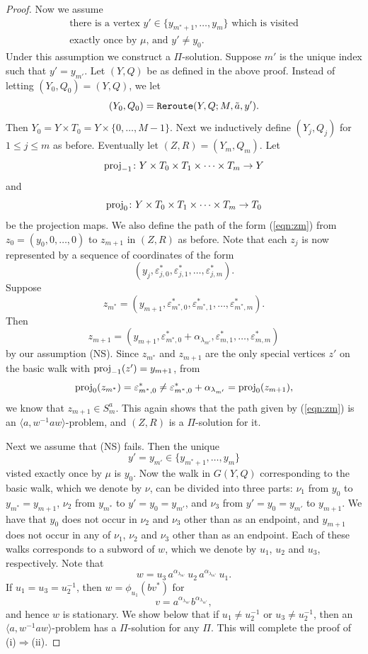 \documentclass[11pt]{amsart}
\theoremstyle{definition}
\theoremstyle{definition}
\numberwithin{equation}{section}
\begin{document}
\begin{proof}
Now we assume
\begin{equation}\label{NS} \tag{NS} \begin{array}{l} \mbox{there is a vertex $y'\in\{y_{m^*+1}, \dots, y_m\}$ which is visited} \\
\mbox{exactly once by $\mu$, and $y'\neq y_0$.}\end{array}
\end{equation}
Under this assumption we construct a $\Pi$-solution. Suppose $m'$ is the unique index such that $y'=y_{m'}$. Let $(Y, Q)$ be as defined in the above proof. Instead of letting $(Y_0, Q_0)=(Y, Q)$, we let
$$ (Y_0, Q_0)=\mbox{\tt Reroute}(Y, Q; M, \tilde{a}, y'). $$
Then $Y_0=Y\times T_0=Y\times \{0, \dots, M-1\}$. Next we inductively define $(Y_j, Q_j)$ for $1\leq j\leq m$ as before. Eventually let $(Z, R)=(Y_m, Q_m)$. Let
$$ \mbox{\rm proj}_{-1}\colon Y\times T_0\times T_1\times \cdots \times T_m\to Y $$
and $$\mbox{\rm proj}_0\colon Y\times T_0\times T_1\times \cdots \times T_m\to T_0 $$
be the projection maps. We also define the path of the form (\ref{eqn:zm}) from $z_0=(y_0, 0, \dots, 0)$ to $z_{m+1}$ in $(Z, R)$ as before. Note that each $z_j$ is now represented by a sequence of coordinates of the form
\begin{equation}\label{eqn:zjcoordinatesnew} (y_j, \varepsilon^*_{j,0}, \varepsilon^*_{j, 1},\dots, \varepsilon^*_{j, m}).
\end{equation}
Suppose 
$$  z_{m^*}=(y_{m+1}, \varepsilon^*_{m^*,0}, \varepsilon^*_{m^*, 1},\dots, \varepsilon^*_{m^*, m}). $$
Then
$$ z_{m+1}=(y_{m+1}, \varepsilon^*_{m^*,0}+\alpha_{\lambda_{m'}}, \varepsilon^*_{m, 1}, \dots, \varepsilon^*_{m, m}) $$
by our assumption (NS). Since $z_{m^*}$ and $z_{m+1}$ are the only special vertices $z'$ on the basic walk with $\mbox{\rm proj}_{-1}(z')=y_{m+1}$, from 
$$ \mbox{\rm proj}_0(z_{m^*})=\varepsilon^*_{m^*, 0}\neq \varepsilon^*_{m^*,0}+\alpha_{\lambda_{m'}}=\mbox{\rm proj}_0(z_{m+1}), $$
we know that $z_{m+1}\in S_m^a$. This again shows that the path given by (\ref{eqn:zm}) is an $\langle a, w^{-1}aw\rangle$-problem, and $(Z, R)$ is a $\Pi$-solution for it.

Next we assume that (NS) fails. Then the unique 
$$y'=y_{m'}\in\{y_{m^*+1}, \dots, y_m\}$$ visted exactly once by $\mu$ is $y_0$. Now the walk in $G(Y, Q)$ corresponding to the basic walk, which we denote by $\nu$, can be divided into three parts: $\nu_1$ from $y_0$ to $y_{m^*}=y_{m+1}$, $\nu_2$ from $y_{m^*}$ to $y'=y_0=y_{m'}$, and $\nu_3$ from $y'=y_0=y_{m'}$ to $y_{m+1}$. We have that $y_0$ does not occur in $\nu_2$ and $\nu_3$ other than as an endpoint, and $y_{m+1}$ does not occur in any of $\nu_1$, $\nu_2$ and $\nu_3$ other than as an endpoint. Each of these walks corresponds to a subword of $w$, which we denote by $u_1$, $u_2$ and $u_3$, respectively. Note that 
$$ w=u_3\, a^{\alpha_{\lambda_{m'}}}\, u_2\, a^{\alpha_{\lambda_{m^*}}}\,  u_1. $$
If $u_1=u_3=u_2^{-1}$, then $w=\phi_{u_1}(bv^*)$ for 
$$ v=a^{\alpha_{\lambda_{m'}}} b^{\alpha_{\lambda_{m^*}}}, $$
and hence $w$ is stationary. We show below that if $u_1\neq u_2^{-1}$ or $u_3\neq u_2^{-1}$, then an $\langle a, w^{-1}aw\rangle$-problem has a $\Pi$-solution for any $\Pi$. This will complete the proof of (i)$\Rightarrow$(ii). 


\end{proof}
\end{document}
